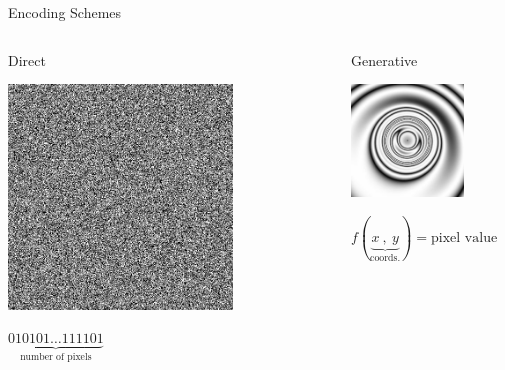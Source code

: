 \documentclass[6pt]{beamer}
\begin{document}
{\begin{frame}{Encoding Schemes}
\begin{columns}[T] %
\begin{column}{.49\textwidth}
\begin{block}{Direct}
\begin{center}
\includegraphics[width=0.7\textwidth]{../Figures/Misc/direct.jpg}
\end{center}
\end{block}
\centering
$\underbrace{010101\ldots111101}_\text{number of pixels}$
\end{column}%
\hfill%
\begin{column}{.49\textwidth}
\begin{block}{Generative}
\begin{center}
\includegraphics[width=0.7\textwidth]{../Figures/Misc/picBreed1.jpg}
\end{center}
\end{block}
\centering
$f(\underbrace{x\   ,\  y}_\text{coords.}) = \text{pixel value}$
\end{column}%
\end{columns}
\end{frame}
}
\end{document}
